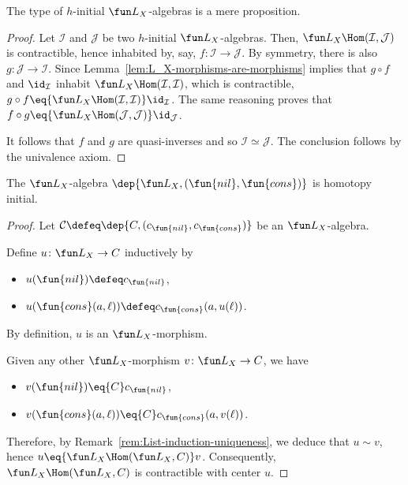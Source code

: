 \begin{thm}
    The type of $h$-initial $\fun L_X$-algebras is a mere proposition.
\end{thm}

\begin{proof}
    Let $\mathcal I$ and $\mathcal J$ be two $h$-initial $\fun L_X$-algebras. Then, $\fun L_X\Hom(\mathcal I,\mathcal J)$ is contractible, hence inhabited by, say, $f\colon\mathcal I\to\mathcal J$. By symmetry, there is also $g\colon\mathcal J\to\mathcal I$. Since  Lemma~\ref{lem:L_X-morphisms-are-morphisms} implies that $g\circ f$ and $\id_{\mathcal I}$ inhabit $\fun L_X\Hom(\mathcal I,\mathcal I)$, which is contractible, $g\circ f\eq{\fun L_X\Hom(\mathcal I,\mathcal I)}\id_{\mathcal I}$. The same reasoning proves that $f\circ g\eq{\fun L_X\Hom(\mathcal J,\mathcal J)}\id_{\mathcal J}$.

    It follows that $f$ and $g$ are quasi-inverses and so $\mathcal I\simeq\mathcal J$. The conclusion follows by the univalence axiom.
\end{proof}

\begin{thm}
    The $\fun L_X$-algebra $\dep{\fun L_X,(\fun{nil},\fun{cons})}$ is homotopy initial.
\end{thm}

\begin{proof}
    Let $\mathcal C\defeq\dep{C,(c_{\fun{nil}},c_{\fun{cons}})}$ be an $\fun L_X$-algebra.

    Define $u\colon\fun L_X\to C$ inductively by
    \begin{itemize}
        \item $u(\fun{nil})\defeq c_{\fun{nil}}$,
        \item $u(\fun{cons}(a,\ell))\defeq c_{\fun{cons}}(a,u(\ell))$.
    \end{itemize}
    By definition, $u$ is an $\fun L_X$-morphism.

    Given any other $\fun L_X$-morphism $v\colon\fun L_X\to C$, we have
    \begin{itemize}
        \item $v(\fun{nil})\eq{C} c_{\fun{nil}}$,
        \item $v(\fun{cons}(a,\ell))\eq{C} c_{\fun{cons}}(a,v(\ell))$.
    \end{itemize}
    Therefore, by Remark~\ref{rem:List-induction-uniqueness}, we deduce that $u\sim v$, hence $u\eq{\fun L_X\Hom(\fun L_X,C)}v$. Consequently, $\fun L_X\Hom(\fun L_X,C)$ is contractible with center $u$.
    
\end{proof}

